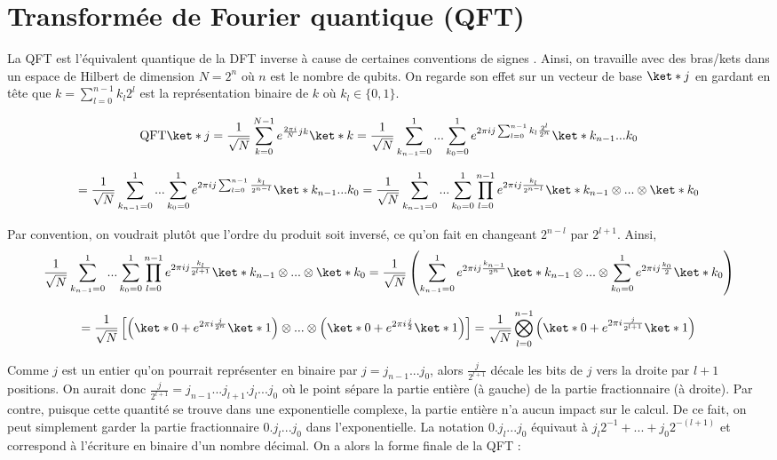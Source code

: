 \section{Transformée de Fourier quantique (QFT)}
La QFT est l'équivalent quantique de la DFT inverse à cause de certaines conventions de signes \cite{nielsen00}. Ainsi, on travaille avec des bras/kets dans un espace de Hilbert de dimension $N= 2^n$ où $n$ est le nombre de qubits. On regarde son effet sur un vecteur de base $\ket*{j}$ en gardant en tête que $k = \sum_{l=0}^{n-1}k_l 2^{l}$ est la représentation binaire de $k$ où $k_l \in \{0,1\}$.

\begin{equation*}
    \text{QFT}\ket*{j} = \frac{1}{\sqrt{N}}\sum_{k=0}^{N-1}e^{\frac{2\pi i}{N}jk}\ket*{k} = \frac{1}{\sqrt{N}}\sum_{k_{n-1} = 0}^{1} ... \sum_{k_0 = 0}^{1}e^{2\pi i j\sum_{l=0}^{n-1}k_l \frac{2^{l}}{2^n}}\ket*{k_{n-1} ... k_{0}}
\end{equation*}

\begin{equation*}
    = \frac{1}{\sqrt{N}}\sum_{k_{n-1} = 0}^{1} ... \sum_{k_0 = 0}^{1} e^{2\pi i j \sum_{l=0}^{n-1} \frac{k_l}{2^{n-l}}} \ket*{k_{n-1} ... k_{0}} = \frac{1}{\sqrt{N}}\sum_{k_{n-1} = 0}^{1} ... \sum_{k_0 = 0}^{1} \prod_{l=0}^{n-1} e^{2\pi i j \frac{k_l}{2^{n-l}}} \ket*{k_{n-1}} \otimes ... \otimes \ket*{k_{0}}
\end{equation*}

Par convention, on voudrait plutôt que l'ordre du produit soit inversé, ce qu'on fait en changeant $2^{n-l}$ par $2^{l+1}$. Ainsi, 
\begin{equation*}
    \frac{1}{\sqrt{N}}\sum_{k_{n-1} = 0}^{1} ... \sum_{k_0 = 0}^{1} \prod_{l=0}^{n-1} e^{2\pi i j \frac{k_l}{2^{l+1}}} \ket*{k_{n-1}} \otimes ... \otimes \ket*{k_{0}} = \frac{1}{\sqrt{N}} \left( \sum_{k_{n-1} = 0}^{1} e^{2\pi i j \frac{k_{n-1}}{2^n}} \ket*{k_{n-1}} \otimes ... \otimes \sum_{k_{0} = 0}^{1} e^{2\pi i j \frac{k_{0}}{2}} \ket*{k_{0}}\right)
\end{equation*}

\begin{equation*}
    = \frac{1}{\sqrt{N}} \left[\left(\ket*{0} + e^{2\pi i\frac{j}{2^n}}\ket*{1} \right) \otimes ... \otimes \left(\ket*{0} + e^{2\pi i\frac{j}{2}}\ket*{1}\right)\right] = \frac{1}{\sqrt{N}}\bigotimes_{l=0}^{n-1} \left(\ket*{0} + e^{2\pi i \frac{j}{2^{l+1}}}\ket*{1}\right)
\end{equation*}

Comme $j$ est un entier qu'on pourrait représenter en binaire par $j = j_{n-1}...j_0$, alors $\frac{j}{2^{l+1}}$ décale les bits de $j$ vers la droite par $l+1$ positions. On aurait donc $\frac{j}{2^{l+1}} = j_{n-1}...j_{l+1}\pmb{.}j_l...j_0$ où le point sépare la partie entière (à gauche) de la partie fractionnaire (à droite). Par contre, puisque cette quantité se trouve dans une exponentielle complexe, la partie entière n'a aucun impact sur le calcul. De ce fait, on peut simplement garder la partie fractionnaire $0\pmb{.}j_l...j_0$ dans l'exponentielle. La notation $0\pmb{.}j_l ... j_0$ équivaut à $j_l2^{-1} + ... + j_0 2^{-(l+1)}$ et correspond à l'écriture en binaire d'un nombre décimal.  On a alors la forme finale de la QFT :

